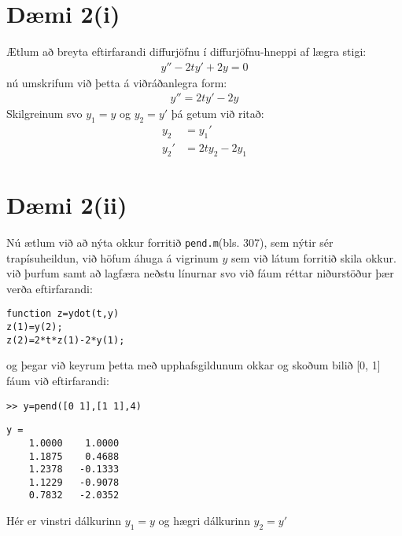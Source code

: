 \documentclass[11pt]{article}
\begin{document}
\section*{Dæmi 2(i)}
Ætlum að breyta eftirfarandi diffurjöfnu í diffurjöfnu-hneppi af lægra stigi:
\begin{align*}
y''-2ty'+2y=0
\end{align*}
nú umskrifum við þetta á viðráðanlegra form:
\begin{align*}
y'' = 2ty'-2y
\end{align*}
Skilgreinum svo $y_1 = y$ og $y_2=y'$ þá getum við ritað:
\begin{align*}
y_2 &= y_1'\\
y_2'&= 2ty_2-2y_1
\end{align*}

\section*{Dæmi 2(ii)}
Nú ætlum við að nýta okkur forritið \texttt{pend.m}(bls. 307), sem nýtir sér trapísuheildun, við höfum áhuga á vigrinum $y$ sem við látum forritið skila okkur. við þurfum samt að lagfæra neðstu línurnar svo við fáum réttar niðurstöður þær verða eftirfarandi:
\begin{verbatim}
function z=ydot(t,y)
z(1)=y(2);
z(2)=2*t*z(1)-2*y(1);
\end{verbatim}
og þegar við keyrum þetta með upphafsgildunum okkar og skoðum bilið [0, 1] fáum við eftirfarandi:
\begin{verbatim}
>> y=pend([0 1],[1 1],4)
\end{verbatim}
\begin{verbatim}
y =
    1.0000    1.0000
    1.1875    0.4688
    1.2378   -0.1333
    1.1229   -0.9078
    0.7832   -2.0352
\end{verbatim}
Hér er vinstri dálkurinn $y_1 = y$ og hægri dálkurinn $y_2=y'$
\end{document}
